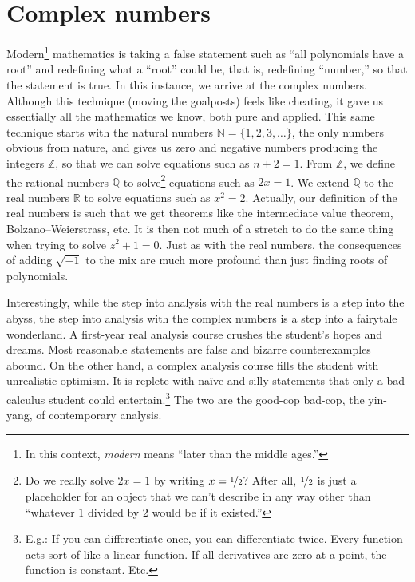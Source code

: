 \documentclass[12pt,openany]{book}
\newcommand{\R}{{\mathbb{R}}}
\newcommand{\Z}{{\mathbb{Z}}}
\newcommand{\N}{{\mathbb{N}}}
\newcommand{\Q}{{\mathbb{Q}}}
\newcommand{\myquote}[1]{``#1''}
\theoremstyle{plain}
\theoremstyle{remark}
\theoremstyle{definition}
\theoremstyle{exercise}
\theoremstyle{example}
\begin{document}
\section{Complex numbers} \label{sec:complexnums}

Modern\footnote{In this context, \emph{modern}
means \myquote{later than the middle ages.}}
mathematics
is taking a false statement such as
\myquote{all polynomials have a root} and redefining what a
\myquote{root} could be, that is,
redefining \myquote{number,}
so that the statement is true.
In this instance, we arrive at the complex numbers.
Although this technique (moving the goalposts)
feels like cheating, it gave us
essentially all the mathematics we know, both pure and applied.
This same
technique starts with the natural numbers
$\N = \{ 1,2,3,\ldots \}$, the only
numbers obvious from nature,
and gives us zero and negative numbers producing the integers
$\Z$, so that we can solve equations such as $n+2 = 1$.
From $\Z$, we define the rational numbers
$\Q$ to solve\footnote{%
Do we really solve $2x=1$ by writing $x = \nicefrac{1}{2}$?  After all, 
$\nicefrac{1}{2}$ is just a placeholder for an object that we can't describe
in any way other than
\myquote{whatever $1$ divided by $2$ would be if it existed.}}
equations such as $2x=1$.  We extend
$\Q$ to the real numbers $\R$
to solve equations such as $x^2=2$.  Actually, our definition 
of the real numbers is such that we get theorems like the
intermediate value theorem, Bolzano--Weierstrass,
etc.  It is then not much of a stretch to do the same thing when trying
to solve $z^2+1=0$.  Just as with the real numbers,
the consequences of adding $\sqrt{-1}$ to the mix are much more
profound than just finding roots of polynomials.

Interestingly, while the step into analysis with the real numbers
is a step into the abyss, the step into analysis with the complex numbers is a
step into a fairytale wonderland.  A first-year real analysis course
crushes the student's hopes and dreams.  Most reasonable statements
are false and bizarre counterexamples abound.
On the other hand, a complex analysis course fills the student with
unrealistic optimism.  It is replete with na\"ive and silly statements
that only a bad calculus student could entertain.\footnote{%
E.g.:  If you can differentiate once, you can differentiate twice.
Every function acts sort of like a linear function.
If all derivatives are zero at a point, the function is constant.
Etc.}
The two are the good-cop bad-cop, the yin-yang,
of contemporary analysis.
\end{document}
